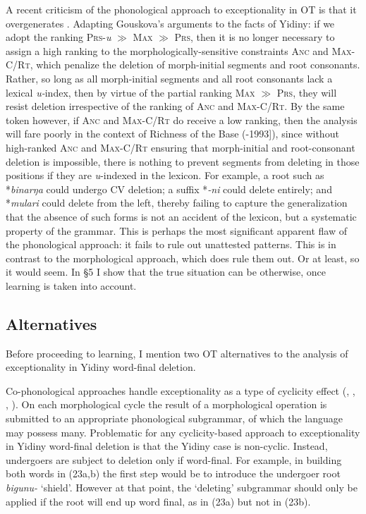 \documentclass[output=paper,
modfonts
]{LSP/langsci}
\begin{document}
A recent criticism of the phonological approach to exceptionality in OT is that it overgenerates \citep{gouskova2012}. Adapting Gouskova's arguments to the facts of Yidiny: if we adopt the ranking \textsc{Prs}\textsc{{}-}\textit{u}\textsc{} \textsc{${\gg}$} \textsc{Max} \textsc{${\gg}$} \textsc{Prs}, then it is no longer necessary to assign a high ranking to the morphologically-sensitive constraints \textsc{Anc} and \textsc{Max-C/Rt}, which penalize the deletion of morph-initial segments and root consonants. Rather, so long as all morph-initial segments and all root consonants lack a lexical \textit{u-}index,\textit{} then by virtue of the partial ranking \textsc{Max} \textsc{${\gg}$} \textsc{Prs}, they will resist deletion irrespective of the ranking of \textsc{Anc} and \textsc{Max-C/Rt}. By the same token however, if \textsc{Anc} and \textsc{Max-C/Rt} do receive a low ranking, then the analysis will fare poorly in the context of Richness of the Base (\citealt{princesmolensky2004}-1993]), since without high-ranked \textsc{Anc} and \textsc{Max-C/Rt} ensuring that morph-initial and root-consonant deletion is impossible, there is nothing to prevent segments from deleting in those positions if they are \textit{u}-indexed in the lexicon. For example, a root such as *\textit{binar}\textit{ŋa} could undergo CV deletion; a suffix *\textit{{}-}\textit{ni} could delete entirely; and *\textit{mu}\textit{lari} could delete from the left, thereby failing to capture the generalization that the absence of such forms is not an accident of the lexicon, but a systematic property of the grammar. This is perhaps the most significant apparent flaw of the phonological approach: it fails to rule out unattested patterns. This is in contrast to the morphological approach, which does rule them out. Or at least, so it would seem. In §5 I show that the true situation can be otherwise, once learning is taken into account. 

\subsection[Alternatives]{Alternatives}

Before proceeding to learning, I mention two OT alternatives to the analysis of exceptionality in Yidiny word-final deletion.

Co-phonological approaches handle exceptionality as a type of cyclicity effect (\citealt{orgun1996}, \citealt{kiparsky2000r}, \citealt{inkelas2007}, \citealt{bermudez-Otero2016}). On each morphological cycle the result of a morphological operation is submitted to an appropriate phonological subgrammar, of which the language may possess many. Problematic for any cyclicity-based approach to exceptionality in Yidiny word-final deletion is that the Yidiny case is non-cyclic. Instead, undergoers are subject to deletion only if word-final. For example, in building both words in (23a,b) the first step would be to introduce the undergoer root \textit{bigunu-} `shield'. However at that point, the `deleting' subgrammar should only be applied if the root will end up word final, as in (23a) but not in (23b). 
\end{document}
